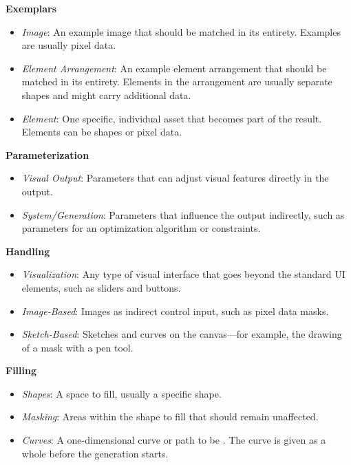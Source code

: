 \noindent\textbf{Exemplars}
\begin{itemize}
    \item \textit{Image}: An example image that should be matched in its entirety. Examples are usually pixel data.
    \item \textit{Element Arrangement}: An example element arrangement that should be matched in its entirety. Elements in the arrangement are usually separate shapes and might carry additional data.
    \item \textit{Element}: One specific, individual asset that becomes part of the result. Elements can be shapes or pixel data.
\end{itemize}

\noindent\textbf{Parameterization}
\begin{itemize}
    \item \textit{Visual Output}: Parameters that can adjust visual features directly in the output.
    \item \textit{System/Generation}: Parameters that influence the output indirectly, such as parameters for an optimization algorithm or constraints.
\end{itemize}

\noindent\textbf{Handling}
\begin{itemize}
    \item \textit{Visualization}: Any type of visual interface that goes beyond the standard UI elements, such as sliders and buttons.
    \item \textit{Image-Based}: Images as indirect control input, such as pixel data masks.
    \item \textit{Sketch-Based}: Sketches and curves  on the canvas---for example, the drawing of a mask with a pen tool.
\end{itemize}

\noindent\textbf{Filling}
\begin{itemize}
    \item \textit{Shapes}: A space to fill, usually a specific shape.
    \item \textit{Masking}: Areas within the shape to fill that should remain unaffected.
    \item \textit{Curves}: A one-dimensional curve or path to be . The curve is given as a whole before the generation starts.
\end{itemize}

